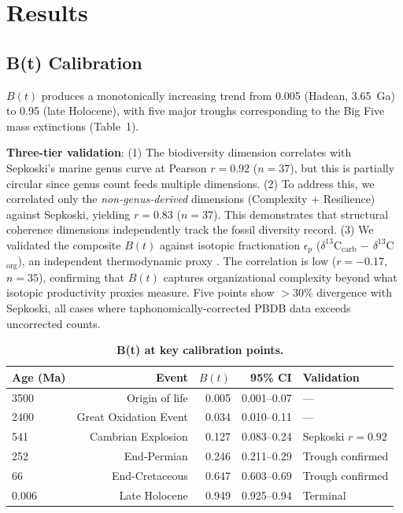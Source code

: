 \documentclass[10pt,letterpaper]{article}
\newcommand{\bt}{$B(t)$}
\begin{document}
\section*{Results}

\subsection*{B(t) Calibration}

\bt{} produces a monotonically increasing trend from 0.005 (Hadean, 3.65~Ga)
to 0.95 (late Holocene), with five major troughs corresponding to the Big
Five mass extinctions (Table~1).

\textbf{Three-tier validation}: (1) The biodiversity dimension correlates
with Sepkoski's marine genus curve at Pearson $r = 0.92$ ($n = 37$), but
this is partially circular since genus count feeds multiple dimensions.
(2) To address this, we correlated only the \emph{non-genus-derived}
dimensions (Complexity + Resilience) against Sepkoski, yielding $r = 0.83$
($n = 37$). This demonstrates that structural coherence dimensions
independently track the fossil diversity record. (3) We validated the
composite \bt{} against isotopic fractionation $\epsilon_p$
($\delta^{13}$C$_\text{carb}$ $-$ $\delta^{13}$C$_\text{org}$), an
independent thermodynamic proxy \cite{hayes1999}. The correlation is low
($r = -0.17$, $n = 35$), confirming that \bt{} captures organizational
complexity beyond what isotopic productivity proxies measure. Five points
show $>$30\% divergence with Sepkoski, all cases where taphonomically-corrected
PBDB data exceeds uncorrected counts.

\begin{table}[H]
\caption{{\bf B(t) at key calibration points.}}
\begin{tabular}{lrrrl}
\toprule
Age (Ma) & Event & $B(t)$ & 95\% CI & Validation \\
\midrule
3500 & Origin of life & 0.005 & 0.001--0.07 & --- \\
2400 & Great Oxidation Event & 0.034 & 0.010--0.11 & --- \\
541 & Cambrian Explosion & 0.127 & 0.083--0.24 & Sepkoski $r = 0.92$ \\
252 & End-Permian & 0.246 & 0.211--0.29 & Trough confirmed \\
66 & End-Cretaceous & 0.647 & 0.603--0.69 & Trough confirmed \\
0.006 & Late Holocene & 0.949 & 0.925--0.94 & Terminal \\
\bottomrule
\end{tabular}
\end{table}
\end{document}
